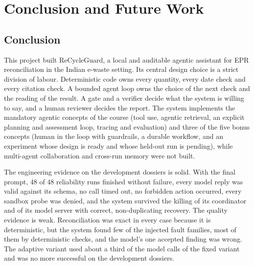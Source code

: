 \chapter{Conclusion and Future Work}
\label{ch:concl}

\section{Conclusion}
This project built ReCycleGuard, a local and auditable agentic assistant for EPR reconciliation in the
Indian e-waste setting. Its central design choice is a strict division of labour. Deterministic code owns
every quantity, every date check and every citation check. A bounded agent loop owns the choice of the
next check and the reading of the result. A gate and a verifier decide what the system is willing to say,
and a human reviewer decides the report. The system implements the mandatory agentic concepts of the course
(tool use, agentic retrieval, an explicit planning and assessment loop, tracing and evaluation) and three of the
five bonus concepts (human in the loop with guardrails, a durable workflow, and an experiment whose design is
ready and whose held-out run is pending), while multi-agent collaboration and cross-run memory were not built.

The engineering evidence on the development dossiers is solid. With the final prompt, 48 of 48 reliability runs
finished without failure, every model reply was valid against its schema, no call timed out, no forbidden
action occurred, every sandbox probe was denied, and the system survived the killing of its coordinator and of
its model server with correct, non-duplicating recovery. The quality evidence is weak. Reconciliation was
exact in every case because it is deterministic, but the system found few of the injected fault families, most
of them by deterministic checks, and the model's one accepted finding was wrong. The adaptive variant used about a
third of the model calls of the fixed variant and was no more successful on the development dossiers.



